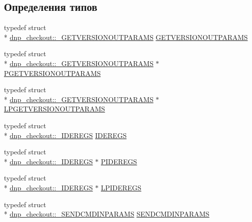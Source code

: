 \subsection*{Определения типов}
\begin{DoxyCompactItemize}
\item 
typedef struct \\*
\hyperlink{structdnp__checkout_1_1___g_e_t_v_e_r_s_i_o_n_o_u_t_p_a_r_a_m_s}{dnp\-\_\-checkout\-::\-\_\-\-G\-E\-T\-V\-E\-R\-S\-I\-O\-N\-O\-U\-T\-P\-A\-R\-A\-M\-S} \hyperlink{namespacednp__checkout_a97d39a4b0d5b567ee5c8862d0e712d46}{G\-E\-T\-V\-E\-R\-S\-I\-O\-N\-O\-U\-T\-P\-A\-R\-A\-M\-S}
\item 
typedef struct \\*
\hyperlink{structdnp__checkout_1_1___g_e_t_v_e_r_s_i_o_n_o_u_t_p_a_r_a_m_s}{dnp\-\_\-checkout\-::\-\_\-\-G\-E\-T\-V\-E\-R\-S\-I\-O\-N\-O\-U\-T\-P\-A\-R\-A\-M\-S} $\ast$ \hyperlink{namespacednp__checkout_a9aa2ed3cd8d18d067b90ee4e6aa20fa4}{P\-G\-E\-T\-V\-E\-R\-S\-I\-O\-N\-O\-U\-T\-P\-A\-R\-A\-M\-S}
\item 
typedef struct \\*
\hyperlink{structdnp__checkout_1_1___g_e_t_v_e_r_s_i_o_n_o_u_t_p_a_r_a_m_s}{dnp\-\_\-checkout\-::\-\_\-\-G\-E\-T\-V\-E\-R\-S\-I\-O\-N\-O\-U\-T\-P\-A\-R\-A\-M\-S} $\ast$ \hyperlink{namespacednp__checkout_a55bbba8cc150436c602208613d048725}{L\-P\-G\-E\-T\-V\-E\-R\-S\-I\-O\-N\-O\-U\-T\-P\-A\-R\-A\-M\-S}
\item 
typedef struct \\*
\hyperlink{structdnp__checkout_1_1___i_d_e_r_e_g_s}{dnp\-\_\-checkout\-::\-\_\-\-I\-D\-E\-R\-E\-G\-S} \hyperlink{namespacednp__checkout_ad6ca05b19c9b8b1d79306987d943d841}{I\-D\-E\-R\-E\-G\-S}
\item 
typedef struct \\*
\hyperlink{structdnp__checkout_1_1___i_d_e_r_e_g_s}{dnp\-\_\-checkout\-::\-\_\-\-I\-D\-E\-R\-E\-G\-S} $\ast$ \hyperlink{namespacednp__checkout_a0b2672b75481f48c72696764070792cd}{P\-I\-D\-E\-R\-E\-G\-S}
\item 
typedef struct \\*
\hyperlink{structdnp__checkout_1_1___i_d_e_r_e_g_s}{dnp\-\_\-checkout\-::\-\_\-\-I\-D\-E\-R\-E\-G\-S} $\ast$ \hyperlink{namespacednp__checkout_a0cfac54c5445e572ff55fc4dbaa560de}{L\-P\-I\-D\-E\-R\-E\-G\-S}
\item 
typedef struct \\*
\hyperlink{structdnp__checkout_1_1___s_e_n_d_c_m_d_i_n_p_a_r_a_m_s}{dnp\-\_\-checkout\-::\-\_\-\-S\-E\-N\-D\-C\-M\-D\-I\-N\-P\-A\-R\-A\-M\-S} \hyperlink{namespacednp__checkout_af07e571714114e47687aff12e8a16581}{S\-E\-N\-D\-C\-M\-D\-I\-N\-P\-A\-R\-A\-M\-S}

\end{DoxyCompactItemize}
